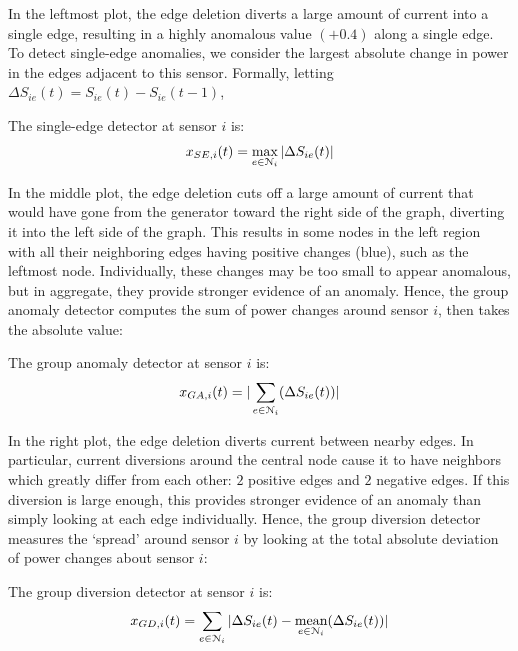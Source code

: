 In the leftmost plot, the edge deletion diverts a large amount of current into a single edge, resulting in a highly anomalous value $(+0.4)$ along a single edge. To detect single-edge anomalies, we consider the largest absolute change in power in the edges adjacent to this sensor. Formally, letting $\Delta S_{ie}(t) =  S_{ie}(t) - S_{ie}(t-1)$,
\begin{definition} \label{dfn:detector1}
The single-edge detector at sensor $i$ is:
\begin{align} \label{eq:detector_se}
x_{SE,i}(t) = \max_{e \in \mathcal{N}_i} |\Delta S_{ie}(t)|
\end{align}
\end{definition}

In the middle plot, the edge deletion cuts off a large amount of current that would have gone from the generator toward the right side of the graph, diverting it into the left side of the graph. This results in some nodes in the left region with all their neighboring edges having positive changes (blue), such as the leftmost node. Individually, these changes may be too small to appear anomalous, but in aggregate, they provide stronger evidence of an anomaly. Hence, the group anomaly detector computes the sum of power changes around sensor $i$, then takes the absolute value:

\begin{definition}
The group anomaly detector at sensor $i$ is:
\begin{align} \label{eq:detector_ga}
x_{GA,i}(t) = |\sum_{e \in \mathcal{N}_i}(\Delta S_{ie}(t))|
\end{align}
\end{definition}

In the right plot, the edge deletion diverts current between nearby edges. In particular, current diversions around the central node cause it to have neighbors which greatly differ from each other: $2$ positive edges and $2$ negative edges. If this diversion is large enough, this provides stronger evidence of an anomaly than simply looking at each edge individually. Hence, the group diversion detector measures the `spread' around sensor $i$ by looking at the total absolute deviation of power changes about sensor $i$:

\begin{definition} \label{dfn:detector3}
The group diversion detector at sensor $i$ is:
\begin{align} \label{eq:detector_gd}
x_{GD,i}(t) = \sum_{e \in \mathcal{N}_i}|\Delta S_{ie}(t) - \underset{e \in \mathcal{N}_i}{\text{mean}}(\Delta S_{ie}(t))|
\end{align}
\end{definition}


